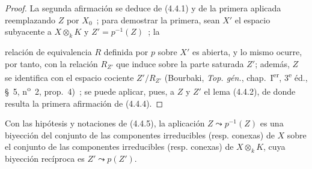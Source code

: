 \begin{proof}
La segunda afirmación se deduce de (4.4.1) y de la primera aplicada reemplazando
$Z$ por $X_0$~; para demostrar la primera, sean $X'$ el espacio subyacente a
$X\otimes_k K$ y $Z'=p^{-1}(Z)$~; la


relación de equivalencia $R$ definida por $p$ sobre $X'$ es abierta, y lo mismo
ocurre, por tanto, con la relación $R_{Z'}$ que induce sobre la parte saturada
$Z'$; además, $Z$ se identifica con el espacio cociente $Z'/R_{Z'}$ (Bourbaki,
\emph{Top. gén.}, chap.~I\textsuperscript{er}, 3\textsuperscript{e} éd.,
\S~5, n\textsuperscript{o}~2, prop.~4)~; se puede aplicar, pues, a $Z$ y $Z'$ el
lema (4.4.2), de donde resulta la primera afirmación de (4.4.4).
\end{proof}

\begin{corollary}[4.4.6]
\label{IV.2.4.4.6-fr}
Con las hipótesis y notaciones de \textup{(4.4.5)}, la aplicación
$Z\leadsto p^{-1}(Z)$ es una biyección del conjunto de las componentes
irreducibles \textup{(resp.} conexas\textup{)} de $X$ sobre el conjunto de las componentes
irreducibles \textup{(resp.} conexas\textup{)} de $X\otimes_k K$, cuya biyección recíproca es
$Z'\leadsto p(Z')$.
\end{corollary}

